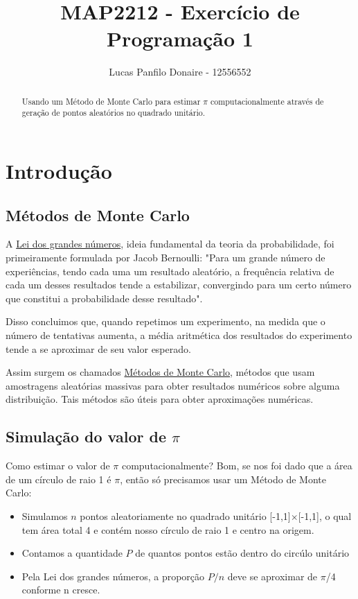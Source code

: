\documentclass{article}
\title{MAP2212 - Exercício de Programação 1}
\author{Lucas Panfilo Donaire - 12556552}
\begin{document}
\maketitle

\begin{abstract}
Usando um Método de Monte Carlo para estimar $\pi$ computacionalmente através de geração de pontos aleatórios no quadrado unitário.
\end{abstract}

\section{Introdução}
\subsection{Métodos de Monte Carlo}

A \href{https://pt.wikipedia.org/wiki/Lei_dos_grandes_n%
} {Lei dos grandes números}, ideia fundamental da teoria da probabilidade, foi primeiramente formulada por Jacob Bernoulli: "Para um grande número de experiências, tendo cada uma um resultado aleatório, a frequência relativa de cada um desses resultados tende a estabilizar, convergindo para um certo número que constitui a probabilidade desse resultado".

Disso concluimos que, quando repetimos um experimento, na medida que o número de tentativas aumenta, a média aritmética dos resultados do experimento tende a se aproximar de seu valor esperado. 

Assim surgem os chamados \href{https://pt.wikipedia.org/wiki/M%
} {Métodos de Monte Carlo}, métodos que usam amostragens aleatórias massivas para obter resultados numéricos sobre alguma distribuição. Tais métodos são úteis para obter aproximações numéricas.

\subsection{Simulação do valor de $\pi$}

Como estimar o valor de $\pi$ computacionalmente? Bom, se nos foi dado que a área de um círculo de raio 1 é $\pi$, então só precisamos usar um Método de Monte Carlo: 

\begin{itemize}
    \item Simulamos $n$ pontos aleatoriamente no quadrado unitário [-1,1]$\times$[-1,1], o qual tem área total 4 e contém nosso círculo de raio 1 e centro na origem.
    \item Contamos a quantidade $P$ de quantos pontos estão dentro do circúlo unitário
    \item Pela Lei dos grandes números, a proporção $P/n$ deve se aproximar de $\pi$/4 conforme n cresce.
\end{itemize}
\end{document}
